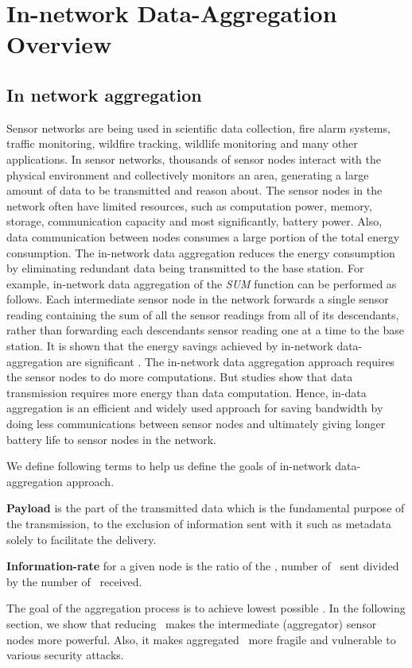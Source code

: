 \chapter{In-network Data-Aggregation Overview} %
\label{cha:In-network Data-Aggregation Overview}

\section{In network aggregation}
	Sensor networks are being used in scientific data collection, fire alarm systems, traffic monitoring, wildfire tracking, wildlife monitoring and many other applications.
	In sensor networks, thousands of sensor nodes interact with the physical environment and collectively monitors an area, generating a large amount of data to be transmitted and reason about.
	The sensor nodes in the network often have limited resources, such as computation power, memory, storage, communication capacity and most significantly, battery power.
	Also, data communication between nodes consumes a large portion of the total energy consumption. 
	The in-network data aggregation reduces the energy consumption by eliminating redundant data being transmitted to the base station.
	For example, in-network data aggregation of the \textit{SUM} function can be performed as follows. 
	Each intermediate sensor node in the network forwards a single sensor reading containing the sum of all the sensor readings from all of its descendants, rather than forwarding each descendants sensor reading one at a time to the base station.
	It is shown that the energy savings achieved by in-network data-aggregation are significant \cite{madden2002tag}.
	The in-network data aggregation approach requires the sensor nodes to do more computations.
	But studies show that data transmission requires more energy than data computation. 
	Hence, in-data aggregation is an efficient and widely used approach for saving bandwidth by doing less communications between sensor nodes and ultimately giving longer battery life to sensor nodes in the network.

	We define following terms to help us define the goals of in-network data-aggregation approach.
	\begin{definition}\label{def:payload}
		\textbf{Payload} is the part of the transmitted data which is the fundamental purpose of the transmission, to the exclusion of information sent with it such as metadata solely to facilitate the delivery.
	\end{definition}
	\begin{definition}\label{def:information-rate}
		\textbf{Information-rate} for a given node is the ratio of the \payloads, number of \payloads\ sent divided by the number of \payloads\ received.
	\end{definition}
	The goal of the aggregation process is to achieve lowest possible \informationRate.
	In the following section, we show that reducing \informationRate\ makes the intermediate (aggregator) sensor nodes more powerful. Also, it makes aggregated \payload\ more fragile and vulnerable to various security attacks.

